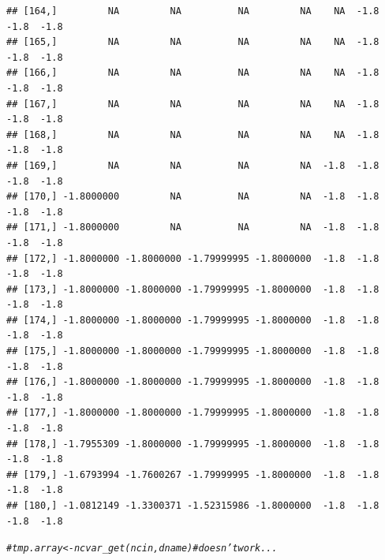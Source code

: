 \documentclass{article}\usepackage[]{graphicx}\usepackage[]{color}
\makeatletter
\newcommand{\hlcom}[1]{\textcolor[rgb]{0.678,0.584,0.686}{\textit{#1}}}%
\newenvironment{kframe}{%
 \def\at@end@of@kframe{}%
 \ifinner\ifhmode%
  \def\at@end@of@kframe{\end{minipage}}%
  \begin{minipage}{\columnwidth}%
 \fi\fi%
 \def\FrameCommand##1{\hskip\@totalleftmargin \hskip-\fboxsep
 \colorbox{shadecolor}{##1}\hskip-\fboxsep
     \hskip-\linewidth \hskip-\@totalleftmargin \hskip\columnwidth}%
 \MakeFramed {\advance\hsize-\width
   \@totalleftmargin\z@ \linewidth\hsize
   \@setminipage}}%
 {\par\unskip\endMakeFramed%
 \at@end@of@kframe}
\newenvironment{knitrout}{}{} %
\makeatother
\begin{document}
\begin{knitrout}
\begin{kframe}
\begin{verbatim}
## [164,]         NA         NA          NA         NA    NA  -1.8  -1.8  -1.8
## [165,]         NA         NA          NA         NA    NA  -1.8  -1.8  -1.8
## [166,]         NA         NA          NA         NA    NA  -1.8  -1.8  -1.8
## [167,]         NA         NA          NA         NA    NA  -1.8  -1.8  -1.8
## [168,]         NA         NA          NA         NA    NA  -1.8  -1.8  -1.8
## [169,]         NA         NA          NA         NA  -1.8  -1.8  -1.8  -1.8
## [170,] -1.8000000         NA          NA         NA  -1.8  -1.8  -1.8  -1.8
## [171,] -1.8000000         NA          NA         NA  -1.8  -1.8  -1.8  -1.8
## [172,] -1.8000000 -1.8000000 -1.79999995 -1.8000000  -1.8  -1.8  -1.8  -1.8
## [173,] -1.8000000 -1.8000000 -1.79999995 -1.8000000  -1.8  -1.8  -1.8  -1.8
## [174,] -1.8000000 -1.8000000 -1.79999995 -1.8000000  -1.8  -1.8  -1.8  -1.8
## [175,] -1.8000000 -1.8000000 -1.79999995 -1.8000000  -1.8  -1.8  -1.8  -1.8
## [176,] -1.8000000 -1.8000000 -1.79999995 -1.8000000  -1.8  -1.8  -1.8  -1.8
## [177,] -1.8000000 -1.8000000 -1.79999995 -1.8000000  -1.8  -1.8  -1.8  -1.8
## [178,] -1.7955309 -1.8000000 -1.79999995 -1.8000000  -1.8  -1.8  -1.8  -1.8
## [179,] -1.6793994 -1.7600267 -1.79999995 -1.8000000  -1.8  -1.8  -1.8  -1.8
## [180,] -1.0812149 -1.3300371 -1.52315986 -1.8000000  -1.8  -1.8  -1.8  -1.8
\end{verbatim}
\begin{alltt}
\hlcom{# tmp.array <- ncvar_get(ncin, dname) # doesn't work...}


\end{alltt}
\end{kframe}
\end{knitrout}
\end{document}
